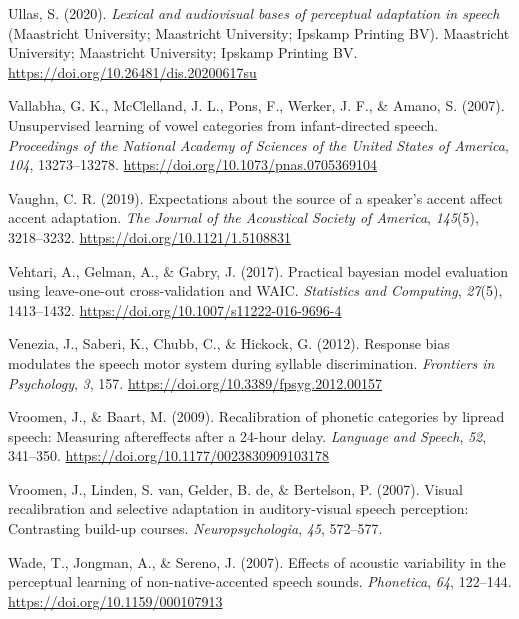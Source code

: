 \documentclass[
  11pt,
  english,
  man,floatsintext]{apa6}
\newlength{\cslhangindent}
\newlength{\cslentryspacingunit} %
\newenvironment{CSLReferences}[2] %
 {%
  \setlength{\parindent}{0pt}
  \ifodd #1
  \let\oldpar\par
  \def\par{\hangindent=\cslhangindent\oldpar}
  \fi
  \setlength{\parskip}{#2\cslentryspacingunit}
 }%
 {}
\begin{document}
\begin{CSLReferences}{1}{0}
\leavevmode{}%
Ullas, S. (2020). \emph{Lexical and audiovisual bases of perceptual adaptation in speech} (Maastricht University; Maastricht University; Ipskamp Printing BV). Maastricht University; Maastricht University; Ipskamp Printing BV. \url{https://doi.org/10.26481/dis.20200617su}

\leavevmode{}%
Vallabha, G. K., McClelland, J. L., Pons, F., Werker, J. F., \& Amano, S. (2007). Unsupervised learning of vowel categories from infant-directed speech. \emph{Proceedings of the National Academy of Sciences of the United States of America}, \emph{104}, 13273--13278. \url{https://doi.org/10.1073/pnas.0705369104}

\leavevmode{}%
Vaughn, C. R. (2019). Expectations about the source of a speaker's accent affect accent adaptation. \emph{The Journal of the Acoustical Society of America}, \emph{145}(5), 3218--3232. \url{https://doi.org/10.1121/1.5108831}

\leavevmode{}%
Vehtari, A., Gelman, A., \& Gabry, J. (2017). Practical bayesian model evaluation using leave-one-out cross-validation and WAIC. \emph{Statistics and Computing}, \emph{27}(5), 1413--1432. \url{https://doi.org/10.1007/s11222-016-9696-4}

\leavevmode{}%
Venezia, J., Saberi, K., Chubb, C., \& Hickock, G. (2012). Response bias modulates the speech motor system during syllable discrimination. \emph{Frontiers in Psychology}, \emph{3}, 157. \url{https://doi.org/10.3389/fpsyg.2012.00157}

\leavevmode{}%
Vroomen, J., \& Baart, M. (2009). Recalibration of phonetic categories by lipread speech: Measuring aftereffects after a 24-hour delay. \emph{Language and Speech}, \emph{52}, 341--350. \url{https://doi.org/10.1177/0023830909103178}

\leavevmode{}%
Vroomen, J., Linden, S. van, Gelder, B. de, \& Bertelson, P. (2007). Visual recalibration and selective adaptation in auditory-visual speech perception: Contrasting build-up courses. \emph{Neuropsychologia}, \emph{45}, 572--577.

\leavevmode{}%
Wade, T., Jongman, A., \& Sereno, J. (2007). Effects of acoustic variability in the perceptual learning of non-native-accented speech sounds. \emph{Phonetica}, \emph{64}, 122--144. \url{https://doi.org/10.1159/000107913}


\end{CSLReferences}
\end{document}
